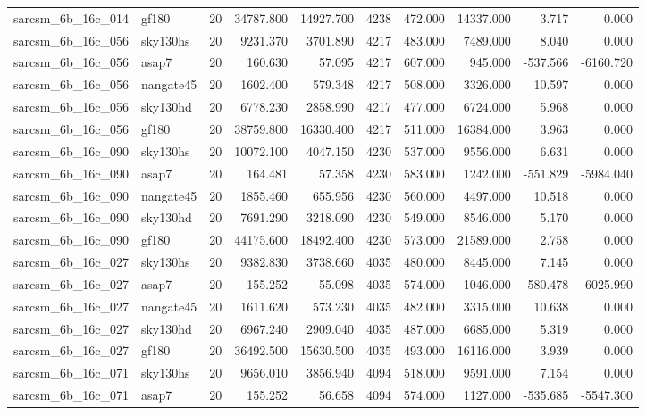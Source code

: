 \documentclass{article}
\begin{document}
\begin{longtable}{llrrrrrrrr}
sarcsm\_6b\_16c\_014 & gf180 & 20 & 34787.800 & 14927.700 & 4238 & 472.000 & 14337.000 & 3.717 & 0.000 \\
sarcsm\_6b\_16c\_056 & sky130hs & 20 & 9231.370 & 3701.890 & 4217 & 483.000 & 7489.000 & 8.040 & 0.000 \\
sarcsm\_6b\_16c\_056 & asap7 & 20 & 160.630 & 57.095 & 4217 & 607.000 & 945.000 & -537.566 & -6160.720 \\
sarcsm\_6b\_16c\_056 & nangate45 & 20 & 1602.400 & 579.348 & 4217 & 508.000 & 3326.000 & 10.597 & 0.000 \\
sarcsm\_6b\_16c\_056 & sky130hd & 20 & 6778.230 & 2858.990 & 4217 & 477.000 & 6724.000 & 5.968 & 0.000 \\
sarcsm\_6b\_16c\_056 & gf180 & 20 & 38759.800 & 16330.400 & 4217 & 511.000 & 16384.000 & 3.963 & 0.000 \\
sarcsm\_6b\_16c\_090 & sky130hs & 20 & 10072.100 & 4047.150 & 4230 & 537.000 & 9556.000 & 6.631 & 0.000 \\
sarcsm\_6b\_16c\_090 & asap7 & 20 & 164.481 & 57.358 & 4230 & 583.000 & 1242.000 & -551.829 & -5984.040 \\
sarcsm\_6b\_16c\_090 & nangate45 & 20 & 1855.460 & 655.956 & 4230 & 560.000 & 4497.000 & 10.518 & 0.000 \\
sarcsm\_6b\_16c\_090 & sky130hd & 20 & 7691.290 & 3218.090 & 4230 & 549.000 & 8546.000 & 5.170 & 0.000 \\
sarcsm\_6b\_16c\_090 & gf180 & 20 & 44175.600 & 18492.400 & 4230 & 573.000 & 21589.000 & 2.758 & 0.000 \\
sarcsm\_6b\_16c\_027 & sky130hs & 20 & 9382.830 & 3738.660 & 4035 & 480.000 & 8445.000 & 7.145 & 0.000 \\
sarcsm\_6b\_16c\_027 & asap7 & 20 & 155.252 & 55.098 & 4035 & 574.000 & 1046.000 & -580.478 & -6025.990 \\
sarcsm\_6b\_16c\_027 & nangate45 & 20 & 1611.620 & 573.230 & 4035 & 482.000 & 3315.000 & 10.638 & 0.000 \\
sarcsm\_6b\_16c\_027 & sky130hd & 20 & 6967.240 & 2909.040 & 4035 & 487.000 & 6685.000 & 5.319 & 0.000 \\
sarcsm\_6b\_16c\_027 & gf180 & 20 & 36492.500 & 15630.500 & 4035 & 493.000 & 16116.000 & 3.939 & 0.000 \\
sarcsm\_6b\_16c\_071 & sky130hs & 20 & 9656.010 & 3856.940 & 4094 & 518.000 & 9591.000 & 7.154 & 0.000 \\
sarcsm\_6b\_16c\_071 & asap7 & 20 & 155.252 & 56.658 & 4094 & 574.000 & 1127.000 & -535.685 & -5547.300 \\

\end{longtable}
\end{document}
